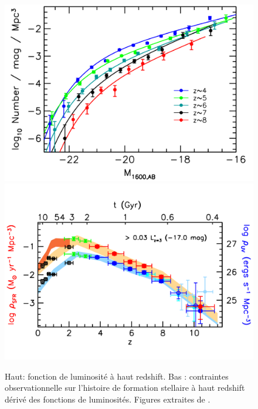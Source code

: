 



\begin{figure}
		\includegraphics[width=.95\linewidth]{img/01/UV_lum_obs.pdf} 
        \includegraphics[width=.95\linewidth]{img/01/SFR_obs.pdf} 
        \caption[Contrainte SFH]{Haut: fonction de luminosité à haut redshift. 
        Bas : contraintes observationnelle sur l'histoire de formation stellaire à haut redshift dérivé des fonctions de luminosités. 
        Figures extraites de \cite{bouwens_reionization_2015}.
 		\label{fig:obs}}
\end{figure}


